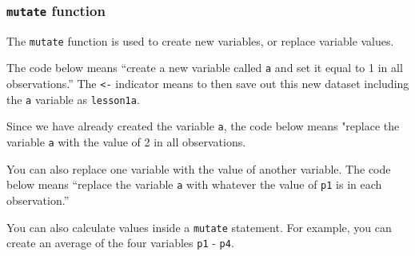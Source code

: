 \documentclass[]{book}
\newenvironment{Shaded}{\begin{snugshade}}{\end{snugshade}}
\newcommand{\DataTypeTok}[1]{\textcolor[rgb]{0.13,0.29,0.53}{#1}}
\newcommand{\DecValTok}[1]{\textcolor[rgb]{0.00,0.00,0.81}{#1}}
\newcommand{\KeywordTok}[1]{\textcolor[rgb]{0.13,0.29,0.53}{\textbf{#1}}}
\newcommand{\NormalTok}[1]{#1}
\newcommand{\OperatorTok}[1]{\textcolor[rgb]{0.81,0.36,0.00}{\textbf{#1}}}
\newcommand{\StringTok}[1]{\textcolor[rgb]{0.31,0.60,0.02}{#1}}
\begin{document}
\hypertarget{mutate-function}{%
\subsubsection{\texorpdfstring{\texttt{mutate} function}{mutate function}}\label{mutate-function}}

The \texttt{mutate} function is used to create new variables, or replace variable values.

The code below means ``create a new variable called \texttt{a} and set it equal to 1 in all observations.'' The \texttt{\textless{}-} indicator means to then save out this new dataset including the \texttt{a} variable as \texttt{lesson1a}.

\begin{Shaded}
\end{Shaded}

Since we have already created the variable \texttt{a}, the code below means "replace the variable \texttt{a} with the value of 2 in all observations.

\begin{Shaded}
\end{Shaded}

You can also replace one variable with the value of another variable. The code below means ``replace the variable \texttt{a} with whatever the value of \texttt{p1} is in each observation.''

\begin{Shaded}
\end{Shaded}

You can also calculate values inside a \texttt{mutate} statement. For example, you can create an average of the four variables \texttt{p1} - \texttt{p4}.
\end{document}

